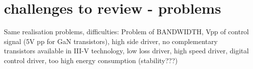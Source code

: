 \section{challenges to review - problems}
Same realisation problems, difficulties: Problem of BANDWIDTH, Vpp of control signal (5V pp for GaN transistors), high side driver, no complementary transistors available in III-V technology, low loss driver, high speed driver, digital control driver, too high energy consumption (stability???)